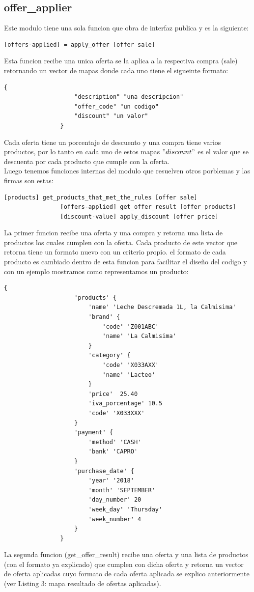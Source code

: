 \documentclass[a4paper, 12pt]{article}
\begin{document}
		\subsection{offer\_applier}
			Este modulo tiene una sola funcion que obra de interfaz publica y es la siguiente:
			\begin{lstlisting}[frame=tb, caption=firmas de la interfaz publica, label=zebra, tabsize=1]
				[offers-applied] = apply_offer [offer sale]
			\end{lstlisting}
			Esta funcion recibe una unica oferta se la aplica a la respectiva compra (sale) retornando un vector de mapas donde 				cada uno tiene el sigueinte formato:
			\begin{lstlisting}[frame=tb, caption=mapa resultado de ofertas aplicadas, label=zebra, tabsize=1]
				{
					"description" "una descripcion"
					"offer_code" "un codigo"
					"discount" "un valor"
				}
			\end{lstlisting}
			Cada oferta tiene un porcentaje de descuento y una compra tiene varios productos, por lo tanto en cada uno de estos 				mapas $"discount"$ es el valor que se descuenta por cada producto que cumple con la oferta.\\
			Luego tenemos funciones internas del modulo que resuelven otros porblemas y las firmas son estas:
			\begin{lstlisting}[frame=tb, caption=firmas de las funciones privadas, label=zebra, tabsize=1]
				[products] get_products_that_met_the_rules [offer sale]
				[offers-applied] get_offer_result [offer products]
				[discount-value] apply_discount [offer price]
			\end{lstlisting}
			La primer funcion recibe una oferta y una compra y retorna una lista de productos los cuales cumplen con la oferta.
			Cada producto de este vector que retorna tiene un formato nuevo con un criterio propio. el formato de cada producto es 				cambiado dentro de esta funcion para facilitar el diseño del codigo y con un ejemplo mostramos como representamos un 				producto:
			\begin{lstlisting}[frame=tb, caption=formato de un producto, label=zebra, tabsize=1]
				{
					'products' {
						'name' 'Leche Descremada 1L, la Calmisima'
						'brand' { 
							'code' 'Z001ABC' 
							'name' 'La Calmisima' 
						}
						'category' { 
							'code' 'X033AXX' 
							'name' 'Lacteo' 
						}
						'price'  25.40
						'iva_porcentage' 10.5
						'code' 'X033XXX'
					}
					'payment' { 
						'method' 'CASH' 
						'bank' 'CAPRO' 
					}
					'purchase_date' {
						'year' '2018'
						'month' 'SEPTEMBER'
						'day_number' 20
						'week_day' 'Thursday'
						'week_number' 4
					}
				}
			\end{lstlisting}
			La segunda funcion (get\_offer\_result) recibe una oferta y una lista de productos (con el formato ya explicado) que 				cumplen con dicha oferta y retorna un vector de oferta aplicadas cuyo formato de cada oferta aplicada se explico 				anteriormente (ver Listing 3: mapa resultado de ofertas aplicadas).
		
\end{document}
